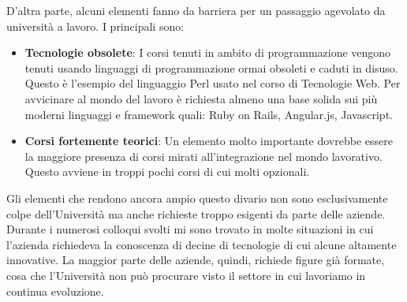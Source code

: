 D'altra parte, alcuni elementi fanno da barriera per un passaggio agevolato da universit\`a a lavoro. I principali sono:

\begin{itemize}
	\item \textbf{Tecnologie obsolete}: I corsi tenuti in ambito di programmazione vengono tenuti usando linguaggi di programmazione ormai obsoleti e caduti in disuso. Questo \`e l'esempio del linguaggio Perl usato nel corso di Tecnologie Web. Per avvicinare al mondo del lavoro \`e richiesta almeno una base solida sui pi\`u moderni linguaggi e framework quali: Ruby on Rails, Angular.js, Javascript.
	
	\item \textbf{Corsi fortemente teorici}: Un elemento molto importante dovrebbe essere la maggiore presenza di corsi mirati all'integrazione nel mondo lavorativo. Questo avviene in troppi pochi corsi di cui molti opzionali.
\end{itemize}

Gli elementi che rendono ancora ampio questo divario non sono esclusivamente colpe dell'Universit\`a ma anche richieste troppo esigenti da parte delle aziende.\\
Durante i numerosi colloqui svolti mi sono trovato in molte situazioni in cui l'azienda richiedeva la conoscenza di decine di tecnologie di cui alcune altamente innovative. La maggior parte delle aziende, quindi, richiede figure gi\`a formate, cosa che l'Universit\`a non pu\`o procurare visto il settore in cui lavoriamo in continua evoluzione.  

